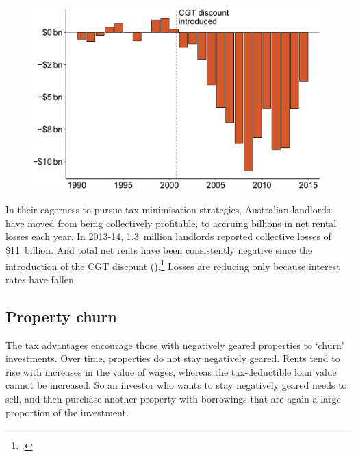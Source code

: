 \documentclass{grattanAlpha}\usepackage[]{graphicx}\usepackage[]{color}
\begin{document}
\begin{figure}

\includegraphics[width=\columnwidth]{CGT-NG-atlas//Net-rent-time-series-1}

\end{figure}

In their eagerness to pursue tax minimisation strategies, Australian landlords have moved from being collectively profitable, to accruing billions in net rental losses each year.
In 2013-14, 1.3~million landlords reported collective losses of \$11~billion. 
And total net rents have been consistently negative since the introduction of the CGT discount ().\footcites{Eslake2013}{ATOTaxstats201314}  
Losses are reducing only because interest rates have fallen.

\subsection{Property churn}
The tax advantages encourage those with negatively geared properties to ‘churn’ investments. Over time, properties do not stay negatively geared. Rents tend to rise with increases in the value of wages, whereas the tax-deductible loan value cannot be increased.  So an investor who wants to stay negatively geared needs to sell, and then purchase another property with borrowings that are again a large proportion of the investment.
\end{document}
